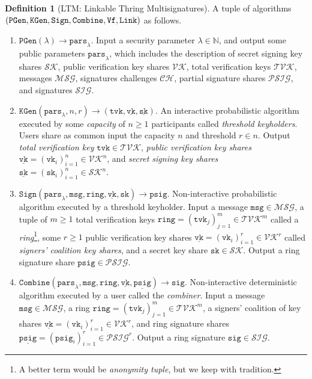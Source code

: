 \documentclass[11pt]{article}
\theoremstyle{definition}
\newtheorem{definition}[definition]{Definition}
\newcommand{\sk}{\texttt{sk}}
\newcommand{\vk}{\texttt{vk}}
\newcommand{\tvk}{\texttt{tvk}}
\newcommand{\ring}{\texttt{ring}}
\newcommand{\SK}{\underline{\texttt{sk}}}
\newcommand{\VK}{\underline{\texttt{vk}}}
\newcommand{\sig}{\texttt{sig}}
\newcommand{\psig}{\texttt{psig}}
\newcommand{\psigs}{\underline{\texttt{psig}}}
\newcommand{\bbn}{\mathbb{N}}
\newcommand{\secpar}{\lambda}
\newcommand{\params}{\texttt{pars}}
\newcommand{\msg}{\texttt{msg}}
\newcommand{\setup}{\texttt{PGen}}
\newcommand{\setupI}{(\secpar)}
\newcommand{\setupO}{\params_\secpar}
\newcommand{\setupIO}{\setup\setupI\to\setupO}
\newcommand{\keygen}{\texttt{KGen}}
\newcommand{\keygenI}{(\setupO,n,r)}
\newcommand{\keygenO}{(\tvk,\VK,\SK)}
\newcommand{\keygenIO}{\keygen\keygenI\to\keygenO}
\newcommand{\sign}{\texttt{Sign}}
\newcommand{\signIbase}{(\setupO,\msg,\ring,\VK,\sk)}
\newcommand{\signO}{\psig}
\newcommand{\signIObase}{\sign\signIbase\to\signO}
\newcommand{\combine}{\texttt{Combine}}
\newcommand{\PSIG}{\underline{\psig}}
\newcommand{\combineIbase}{(\setupO,\msg,\ring,\VK,\PSIG)}
\newcommand{\combineO}{\sig}
\newcommand{\combineIObase}{\combine\combineIbase\to\combineO}
\newcommand{\verify}{\texttt{Vf}}
\newcommand{\link}{\texttt{Link}}
\newcommand{\verifyshare}{\texttt{VfSh}}
\begin{document}
\begin{definition}[LTM: Linkable Thring Multisignatures]\label{def:ltm}
A tuple of algorithms $(\setup, \keygen, \sign, \\ \combine, \verify, \link)$ as follows.
\begin{enumerate}
\item $\setupIO$. Input a security parameter $\secpar \in \bbn$, and output some public parameters $\params_\secpar$, which includes the description of secret signing key shares $\mathcal{SK}$, public verification key shares $\mathcal{VK}$, total verification keys $\mathcal{TVK}$, messages $\mathcal{MSG}$, signatures challenges $\mathcal{CH}$, partial signature shares $\mathcal{PSIG}$, and signatures $\mathcal{SIG}$.

\item $\keygenIO$. An interactive probabilistic algorithm executed by some \textit{capacity} of $n \geq 1$ participants called \textit{threshold keyholders}. Users share as common input the capacity $n$ and threshold $r \in n$. Output  \textit{total verification key} $\tvk \in \mathcal{TVK}$, \textit{public verification key shares} $\VK=(\vk_i)_{i=1}^{n} \in \mathcal{VK}^n$, and \textit{secret signing key shares} $\SK = (\sk_i)_{i=1}^{n} \in \mathcal{SK}^n$.



\item $\signIObase$. Non-interactive probabilistic algorithm executed by a threshold keyholder. Input a message $\msg \in \mathcal{MSG}$, a tuple of $m \geq 1$ total verification keys $\ring = (\tvk_j)_{j=1}^{m} \in \mathcal{TVK}^m$ called a \textit{ring}\footnote{A better term would be \textit{anonymity tuple}, but we keep with tradition.}, some $r \geq 1$ public verification key shares $\VK = (\vk_i)_{i=1}^{r} \in \mathcal{VK}^r$ called \textit{signers' coalition key shares},  and a secret key share $\sk \in \mathcal{SK}$. Output a ring signature share $\psig \in \mathcal{PSIG}$.


\item $\combineIObase$. Non-interactive deterministic algorithm executed by a user called the \textit{combiner}. Input a message $\msg \in \mathcal{MSG}$, a ring $\ring = (\tvk_j)_{j=1}^{m} \in \mathcal{TVK}^m$,  a signers' coalition of key shares $\VK = (\vk_i)_{i=1}^{r} \in \mathcal{VK}^r$,  and ring signature shares $\psigs=(\psig_i)_{i=1}^{r} \in \mathcal{PSIG}^r$. Output a ring signature $\sig \in \mathcal{SIG}$.


\end{enumerate}
\end{definition}
\end{document}
